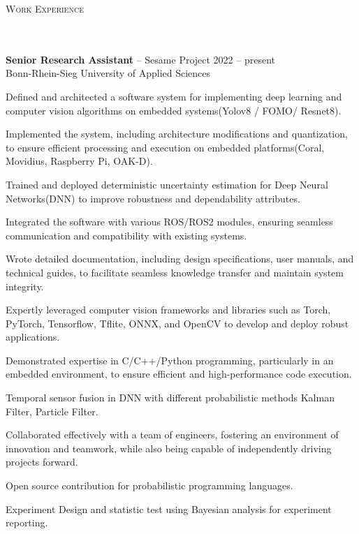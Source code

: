 \documentclass{article}
\newcommand{\header}[1]{{
\hspace*{-15pt}\vspace*{6pt} \textsc{#1}} \vspace*{-6pt} 
\lineunder
}
\newcommand{\lineunder}{
\vspace*{-8pt} \\ \hspace*{-18pt} 
\hrulefill \\
}
\newcommand{\employer}[4]{{
\vspace*{2pt}%
\textbf{#1} #2 \hfill #3\\ #4 \vspace*{2pt}}
}
\renewcommand{\labelitemii}{
	\raisebox{0.3ex}{\tiny\textbullet}
}
\newenvironment{bullet-list-minor}{
\begin{list}{\labelitemii}{\setlength\leftmargin{15pt} 
\topsep 0pt \itemsep -2pt}}{\vspace*{4pt}\end{list}
}
\begin{document}
\vspace*{4pt}%
\header{Work Experience}
    \employer{Senior Research Assistant}{-- Sesame Project}{2022 -- present}
    {Bonn-Rhein-Sieg University of Applied Sciences}
	\begin{bullet-list-minor}
		\item  Defined and architected a software system for implementing deep learning and computer vision algorithms on embedded systems(Yolov8 / FOMO/ Resnet8).
		\item  Implemented the system, including architecture modifications and quantization, to ensure efficient processing and execution on embedded platforms(Coral, Movidius, Raspberry Pi, OAK-D).
		\item  Trained and deployed deterministic uncertainty estimation for Deep Neural Networks(DNN) to improve robustness and dependability attributes.
		\item  Integrated the software with various ROS/ROS2 modules, ensuring seamless communication and compatibility with existing systems.
		\item  Wrote detailed documentation, including design specifications, user manuals, and technical guides, to facilitate seamless knowledge transfer and maintain system integrity.
		\item  Expertly leveraged computer vision frameworks and libraries such as Torch, PyTorch, Tensorflow, Tflite, ONNX, and OpenCV to develop and deploy robust applications.
		\item  Demonstrated expertise in C/C++/Python programming, particularly in an embedded environment, to ensure efficient and high-performance code execution.
		\item  Temporal sensor fusion in DNN with different probabilistic methods Kalman Filter, Particle Filter. 
		\item  Collaborated effectively with a team of engineers, fostering an environment of innovation and teamwork, while also being capable of independently driving projects forward.
		\item  Open source contribution for probabilistic programming languages.
		\item  Experiment Design and statistic test using Bayesian analysis for experiment reporting.
    \end{bullet-list-minor}
    
\end{document}
